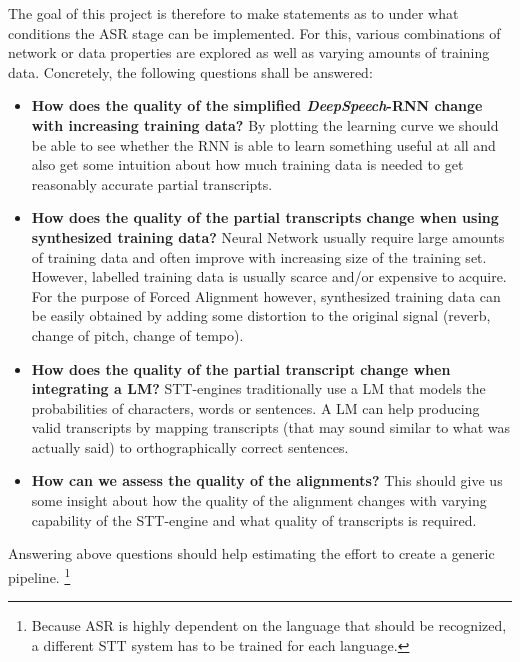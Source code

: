 The goal of this project is therefore to make statements as to under what conditions the \ac{ASR} stage can be implemented. For this, various combinations of network or data properties are explored as well as varying amounts of training data. Concretely, the following questions shall be answered:

\begin{itemize}
	\item \textbf{How does the quality of the simplified \textit{DeepSpeech}-\ac{RNN} change with increasing training data?} By plotting the learning curve we should be able to see whether the RNN is able to learn something useful at all and also get some intuition about how much training data is needed to get reasonably accurate partial transcripts.
	\item \textbf{How does the quality of the partial transcripts change when using synthesized training data?} Neural Network usually require large amounts of training data and often improve with increasing size of the training set. However, labelled training data is usually scarce and/or expensive to acquire. For the purpose of Forced Alignment however, synthesized training data can be easily obtained by adding some distortion to the original signal (reverb, change of pitch, change of tempo).
	\item \textbf{How does the quality of the partial transcript change when integrating a \ac{LM}?} \ac{STT}-engines traditionally use a \ac{LM} that models the probabilities of characters, words or sentences. A \ac{LM} can help producing valid transcripts by mapping transcripts (that may sound similar to what was actually said) to orthographically correct sentences.
	\item \textbf{How can we assess the quality of the alignments?} This should give us some insight about how the quality of the alignment changes with varying capability of the \ac{STT}-engine and what quality of transcripts is required.
\end{itemize}

Answering above questions should help estimating the effort to create a generic pipeline. \footnote{Because \ac{ASR} is highly dependent on the language that should be recognized, a different \ac{STT} system has to be trained for each language.}

